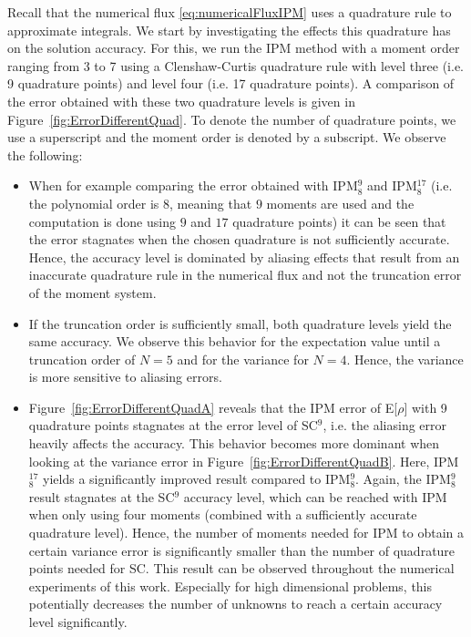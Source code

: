 Recall that the numerical flux \eqref{eq:numericalFluxIPM} uses a quadrature rule to approximate integrals. We start by investigating the effects this quadrature has on the solution accuracy. For this, we run the IPM method with a moment order ranging from 3 to 7 using a Clenshaw-Curtis quadrature rule with level three (i.e. 9 quadrature points) and level four (i.e. 17 quadrature points). A comparison of the error obtained with these two quadrature levels is given in Figure~\ref{fig:ErrorDifferentQuad}. To denote the number of quadrature points, we use a superscript and the moment order is denoted by a subscript. We observe the following:
\begin{itemize}
\item When for example comparing the error obtained with IPM$_8^9$ and IPM$_8^{17}$ (i.e. the polynomial order is $8$, meaning that $9$ moments are used and the computation is done using $9$ and $17$ quadrature points) it can be seen that the error stagnates when the chosen quadrature is not sufficiently accurate. Hence, the accuracy level is dominated by aliasing effects that result from an inaccurate quadrature rule in the numerical flux and not the truncation error of the moment system.
\item If the truncation order is sufficiently small, both quadrature levels yield the same accuracy. We observe this behavior for the expectation value until a truncation order of $N=5$ and for the variance for $N=4$. Hence, the variance is more sensitive to aliasing errors.
\item Figure~\ref{fig:ErrorDifferentQuadA} reveals that the IPM error of E[$\rho$] with 9 quadrature points stagnates at the error level of SC$^9$, i.e. the aliasing error heavily affects the accuracy. This behavior becomes more dominant when looking at the variance error in Figure~\ref{fig:ErrorDifferentQuadB}. Here, IPM$_8^{17}$ yields a significantly improved result compared to IPM$_8^9$. Again, the IPM$_8^9$ result stagnates at the SC$^9$ accuracy level, which can be reached with IPM when only using four moments (combined with a sufficiently accurate quadrature level). Hence, the number of moments needed for IPM to obtain a certain variance error is significantly smaller than the number of quadrature points needed for SC. This result can be observed throughout the numerical experiments of this work. Especially for high dimensional problems, this potentially decreases the number of unknowns to reach a certain accuracy level significantly. %
\end{itemize}

